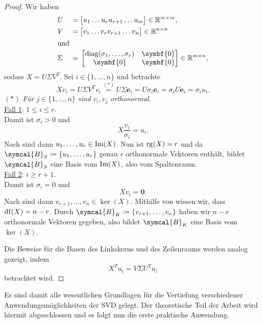 \begin{proof}
    Wir haben
    \begin{alignat*}{2}
        &U &{}={}&
        \big[
        \begin{matrix}
            u_1 \dots u_{r}u_{r+1} \dots u_m
        \end{matrix}
        \big]
        \in \R^{m \times m}, \\
        &V &{}={}&
        \big[
        \begin{matrix}
            v_1 \dots v_{r}v_{r+1} \dots v_n
        \end{matrix}
        \big]
        \in \R^{n \times n} \\
        \intertext{und} 
        &\Sigma &{}={}&
        \begin{bmatrix}
            \diag(\sigma_1,\ldots,\sigma_r) & \symbf{0} \\
            \symbf{0} & \symbf{0}
        \end{bmatrix}
        \in \R^{m \times n},
    \end{alignat*} 
    sodass
    \(
        X = U \Sigma V^{T}
    \).
    Sei \(i \in \{1,\ldots,n\}\) und betrachte 
    \begin{equation*}
        Xv_i = U \Sigma V^{T}v_i \overset{(*)}{=} U \Sigma \symbf{e}_i = U \sigma_i \symbf{e}_i = \sigma_i U \symbf{e}_i = \sigma_i u_i.
    \end{equation*}
    {\small\((*)\) \textit{Für} \(j \in \{1,\ldots,n\}\) \textit{sind} \(v_i, v_j\) \textit{orthonormal}.} 
    \vspace{5pt}
    \\
    \underline{Fall 1}: \(1 \leq i \leq r\). \\
    Damit ist \(\sigma_i > 0\) und
    \begin{equation*}
        X \frac{v_i}{\sigma_i} = u_i.
    \end{equation*} 
    Nach  sind dann \(u_1,\ldots,u_r \in \operatorname{Im}(X)\).
    Nun ist \(\operatorname{rg}(X) = r\) und da \(\symcal{B}_S \coloneq \{u_1,\ldots,u_r\}\) genau \(r\) orthonormale Vektoren enthält, bildet \(\symcal{B}_S\) eine Basis vom \(\operatorname{Im}(X)\), also vom Spaltenraum. 
    \vspace{5pt} \\
    \underline{Fall 2}: \(i \geq r+1\). \\
    Damit ist \(\sigma_i = 0\) und
    \begin{equation*}
        Xv_i = \symbf{0}.
    \end{equation*}  
    Nach  sind dann \(v_{r+1},\ldots,v_n \in \ker(X)\).
    Mithilfe von  wissen wir, dass \(\operatorname{df}(X) = n - r\). 
    Durch \(\symcal{B}_K \coloneq \{v_{r+1},\ldots,v_n\}\) haben wir \(n-r\) orthonormale Vektoren gegeben, also bildet \(\symcal{B}_K\) eine Basis vom \(\ker(X)\).
    
    Die Beweise für die Basen des Linkskerns und des Zeilenraums werden analog gezeigt, indem
    \begin{equation*}
        X^{T}u_i = V \Sigma U^{T} u_i
    \end{equation*}
    betrachtet wird.
\end{proof}

Es sind damit alle wesentlichen Grundlagen für die Vertiefung verschiedener Anwendungsmöglichkeiten der SVD gelegt.
Der theoretische Teil der Arbeit wird hiermit abgeschlossen und es folgt nun die erste praktische Anwendung.

